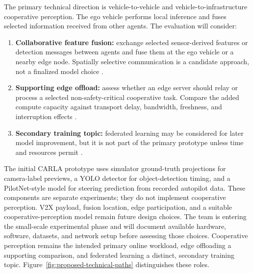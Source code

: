 \documentclass[12pt,a4paper,oneside]{report}
\begin{document}
\begin{samepage}
The primary technical direction is vehicle-to-vehicle and
vehicle-to-infrastructure cooperative perception. The ego vehicle performs
local inference and fuses selected information received from other agents.
The evaluation will consider:
\begin{enumerate}
  \item \textbf{Collaborative feature fusion:} exchange selected
  sensor-derived features or detection messages between agents and fuse
  them at the ego vehicle or a nearby edge node. Spatially selective
  communication is a candidate approach, not a finalized model choice
  \cite{v2xvit2022,where2comm2022,cobevt2023}.
  \item \textbf{Supporting edge offload:} assess whether an edge server
  should relay or process a selected non-safety-critical cooperative task.
  Compare the added compute capacity against transport delay, bandwidth,
  freshness, and interruption effects \cite{hou2022,v2xsurvey2025}.
  \item \textbf{Secondary training topic:} federated learning may be
  considered for later model improvement, but it is not part of the primary
  prototype unless time and resources permit
  \cite{flcav2024,mcmahan2017}.
\end{enumerate}

The initial CARLA prototype uses simulator ground-truth projections for
camera-label previews, a YOLO detector for object-detection timing, and a
PilotNet-style model for steering prediction from recorded autopilot data.
These components are separate experiments; they do not implement
cooperative perception. V2X payload, fusion location, edge participation,
and a suitable cooperative-perception model remain future design choices.
The team is entering the small-scale experimental phase and will document
available hardware, software, datasets, and network setup before assessing
those choices. Cooperative perception remains the intended primary online
workload, edge offloading a supporting comparison, and federated learning
a distinct, secondary training topic. Figure~\ref{fig:proposed-technical-paths}
distinguishes these roles.
\end{samepage}
\end{document}
